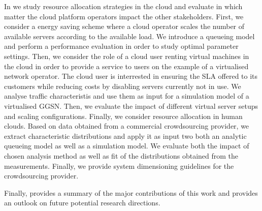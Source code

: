 In  we study resource allocation strategies in the cloud and evaluate in which matter the cloud platform operators impact the other stakeholders.
First, we consider a energy saving scheme where a cloud operator scales the number of available servers according to the available load.
We introduce a queueing model and perform a performance evaluation in order to study optimal parameter settings.
Then, we consider the role of a cloud user renting virtual machines in the cloud in order to provide a service to users on the example of a virtualised network operator.
The cloud user is interrested in ensuring the \gls{SLA} offered to its customers while reducing costs by disabling servers currently not in use.
We analyse traffic characteristis and use them as input for a simulation model of a virtualised \gls{GGSN}.
Then, we evaluate the impact of different virtual server setups and scaling configurations.
Finally, we consider resource allocation in human clouds.
Based on data obtained from a commercial crowdsourcing provider, we extract characteristic distributions and apply it as input two both an analytic queueing model as well as a simulation model.
We evaluate both the impact of chosen analysis method as well as fit of the distributions obtained from the measurements.
Finally, we provide system dimensioning guidelines for the crowdsourcing provider.

Finally,  provides a summary of the major contributions of this work and provides an outlook on future potential research directions.
